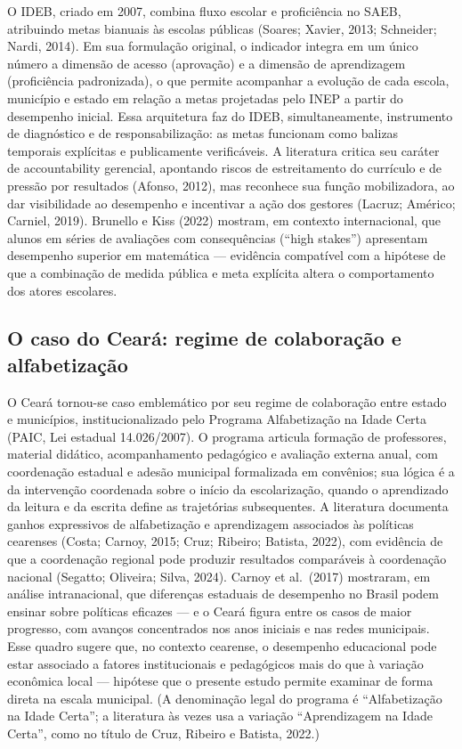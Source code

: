 \documentclass[12pt,a4paper]{article}
\begin{document}
O IDEB, criado em 2007, combina fluxo escolar e proficiência no SAEB, atribuindo metas bianuais às escolas públicas (Soares; Xavier, 2013; Schneider; Nardi, 2014). Em sua formulação original, o indicador integra em um único número a dimensão de acesso (aprovação) e a dimensão de aprendizagem (proficiência padronizada), o que permite acompanhar a evolução de cada escola, município e estado em relação a metas projetadas pelo INEP a partir do desempenho inicial. Essa arquitetura faz do IDEB, simultaneamente, instrumento de diagnóstico e de responsabilização: as metas funcionam como balizas temporais explícitas e publicamente verificáveis. A literatura critica seu caráter de accountability gerencial, apontando riscos de estreitamento do currículo e de pressão por resultados (Afonso, 2012), mas reconhece sua função mobilizadora, ao dar visibilidade ao desempenho e incentivar a ação dos gestores (Lacruz; Américo; Carniel, 2019). Brunello e Kiss (2022) mostram, em contexto internacional, que alunos em séries de avaliações com consequências (``high stakes'') apresentam desempenho superior em matemática --- evidência compatível com a hipótese de que a combinação de medida pública e meta explícita altera o comportamento dos atores escolares.

\subsection{O caso do Ceará: regime de colaboração e alfabetização}

O Ceará tornou-se caso emblemático por seu regime de colaboração entre estado e municípios, institucionalizado pelo Programa Alfabetização na Idade Certa (PAIC, Lei estadual 14.026/2007). O programa articula formação de professores, material didático, acompanhamento pedagógico e avaliação externa anual, com coordenação estadual e adesão municipal formalizada em convênios; sua lógica é a da intervenção coordenada sobre o início da escolarização, quando o aprendizado da leitura e da escrita define as trajetórias subsequentes. A literatura documenta ganhos expressivos de alfabetização e aprendizagem associados às políticas cearenses (Costa; Carnoy, 2015; Cruz; Ribeiro; Batista, 2022), com evidência de que a coordenação regional pode produzir resultados comparáveis à coordenação nacional (Segatto; Oliveira; Silva, 2024). Carnoy et al.\ (2017) mostraram, em análise intranacional, que diferenças estaduais de desempenho no Brasil podem ensinar sobre políticas eficazes --- e o Ceará figura entre os casos de maior progresso, com avanços concentrados nos anos iniciais e nas redes municipais. Esse quadro sugere que, no contexto cearense, o desempenho educacional pode estar associado a fatores institucionais e pedagógicos mais do que à variação econômica local --- hipótese que o presente estudo permite examinar de forma direta na escala municipal. (A denominação legal do programa é ``Alfabetização na Idade Certa''; a literatura às vezes usa a variação ``Aprendizagem na Idade Certa'', como no título de Cruz, Ribeiro e Batista, 2022.)
\end{document}
